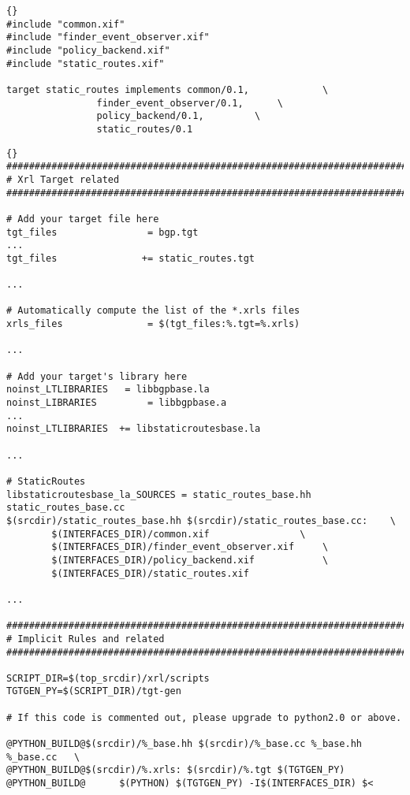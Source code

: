 \documentclass[11pt]{article}
\begin{document}
\begin{lstlisting}[caption={Contents of {\stt
	xorp/xrl/targets/static\_routes.tgt} %
                                     \label{lst:sr.tgt} } ]{}
#include "common.xif"
#include "finder_event_observer.xif"
#include "policy_backend.xif"
#include "static_routes.xif"

target static_routes implements	common/0.1,				\
				finder_event_observer/0.1,		\
				policy_backend/0.1,			\
				static_routes/0.1
\end{lstlisting}

\begin{lstlisting}[caption={Extracts from {\stt xorp/xrl/targets/Makefile.am} %
                                     \label{lst:tgt.makefile} } ]{}
###############################################################################
# Xrl Target related
###############################################################################

# Add your target file here
tgt_files                = bgp.tgt
...
tgt_files               += static_routes.tgt

...

# Automatically compute the list of the *.xrls files
xrls_files               = $(tgt_files:%.tgt=%.xrls)

...

# Add your target's library here
noinst_LTLIBRARIES	 = libbgpbase.la
noinst_LIBRARIES         = libbgpbase.a
...
noinst_LTLIBRARIES	+= libstaticroutesbase.la

...

# StaticRoutes
libstaticroutesbase_la_SOURCES = static_routes_base.hh static_routes_base.cc
$(srcdir)/static_routes_base.hh $(srcdir)/static_routes_base.cc:	\
		$(INTERFACES_DIR)/common.xif 				\
		$(INTERFACES_DIR)/finder_event_observer.xif		\
		$(INTERFACES_DIR)/policy_backend.xif			\
		$(INTERFACES_DIR)/static_routes.xif

...

###############################################################################
# Implicit Rules and related
###############################################################################

SCRIPT_DIR=$(top_srcdir)/xrl/scripts
TGTGEN_PY=$(SCRIPT_DIR)/tgt-gen

# If this code is commented out, please upgrade to python2.0 or above.

@PYTHON_BUILD@$(srcdir)/%_base.hh $(srcdir)/%_base.cc %_base.hh %_base.cc   \
@PYTHON_BUILD@$(srcdir)/%.xrls: $(srcdir)/%.tgt $(TGTGEN_PY)
@PYTHON_BUILD@      $(PYTHON) $(TGTGEN_PY) -I$(INTERFACES_DIR) $<
\end{lstlisting}
\end{document}
